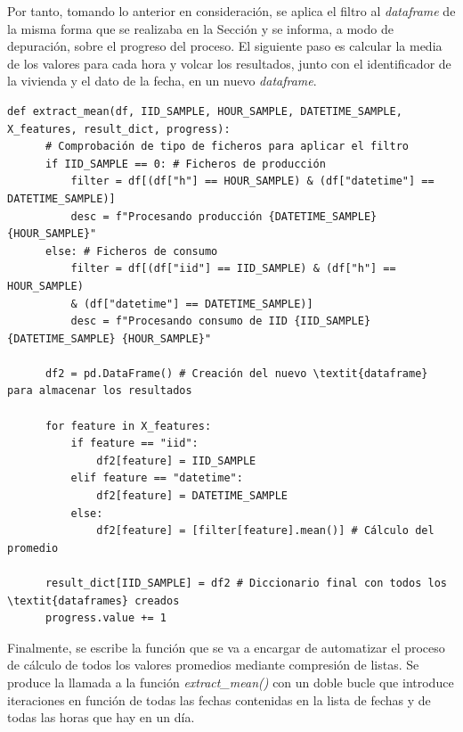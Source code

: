 \vspace{3mm}

Por tanto, tomando lo anterior en consideración, se aplica el filtro al \textit{dataframe} de la misma forma que se realizaba en la Sección \label{sec:datasamples} y se informa, a modo de depuración, sobre el progreso del proceso. El siguiente paso es calcular la media de los valores para cada hora y volcar los resultados, junto con el identificador de la vivienda y el dato de la fecha, en un nuevo \textit{dataframe}.

\vspace{3mm}

\begin{lstlisting}[style=Python, caption={Función de cálculo del promedio}]
  def extract_mean(df, IID_SAMPLE, HOUR_SAMPLE, DATETIME_SAMPLE, X_features, result_dict, progress):
      # Comprobación de tipo de ficheros para aplicar el filtro
      if IID_SAMPLE == 0: # Ficheros de producción
          filter = df[(df["h"] == HOUR_SAMPLE) & (df["datetime"] == DATETIME_SAMPLE)]
          desc = f"Procesando producción {DATETIME_SAMPLE} {HOUR_SAMPLE}"
      else: # Ficheros de consumo
          filter = df[(df["iid"] == IID_SAMPLE) & (df["h"] == HOUR_SAMPLE) 
          & (df["datetime"] == DATETIME_SAMPLE)]
          desc = f"Procesando consumo de IID {IID_SAMPLE} {DATETIME_SAMPLE} {HOUR_SAMPLE}"

      df2 = pd.DataFrame() # Creación del nuevo \textit{dataframe} para almacenar los resultados

      for feature in X_features:
          if feature == "iid":
              df2[feature] = IID_SAMPLE
          elif feature == "datetime":
              df2[feature] = DATETIME_SAMPLE
          else:
              df2[feature] = [filter[feature].mean()] # Cálculo del promedio

      result_dict[IID_SAMPLE] = df2 # Diccionario final con todos los \textit{dataframes} creados
      progress.value += 1
\end{lstlisting}

\vspace{3mm}

Finalmente, se escribe la función que se va a encargar de automatizar el proceso de cálculo de todos los valores promedios mediante compresión de listas. Se produce la llamada a la función \textit{extract\_mean()} con un doble bucle que introduce iteraciones en función de todas las fechas contenidas en la lista de fechas y de todas las horas que hay en un día.

